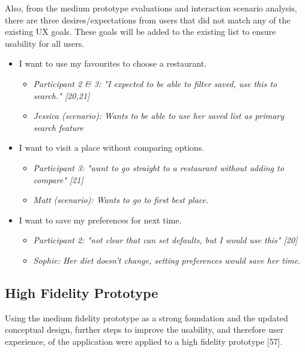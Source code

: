 \documentclass[a4 paper, 12pt]{article}
\begin{document}
    Also, from the medium prototype evaluations and interaction scenario analysis, there are three desires/expectations from users that did not match any of the existing UX goals. These goals will be added to the existing list to ensure usability for all users.
        \begin{itemize}
            \item I want to use my favourites to choose a restaurant.  
                \begin{itemize}
                    \item \textit{Participant 2 \& 3: "I expected to be able to filter saved, use this to search." [20,21]}
                    \item \textit{Jessica (scenario): Wants to be able to use her saved list as primary search feature}
                \end{itemize}
            \item I want to visit a place without comparing options. 
                \begin{itemize}
                    \item \textit{Participant 3: "want to go straight to a restaurant without adding to compare" [21]}
                    \item \textit{Matt (scenario): Wants to go to first best place.}
                \end{itemize}
            \item I want to save my preferences for next time. 
                \begin{itemize}
                    \item \textit{Participant 2: "not clear that can set defaults, but I would use this" [20]}
                    \item \textit{Sophie: Her diet doesn't change, setting preferences would save her time.}
                \end{itemize}          
        \end{itemize}


\subsection{High Fidelity Prototype}
Using the medium fidelity prototype as a strong foundation and the updated conceptual design, further steps to improve the usability, and therefore user experience, of the application were applied to a high fidelity prototype [57].
\end{document}
